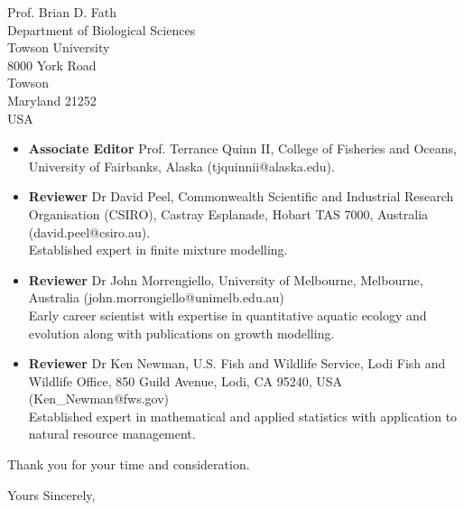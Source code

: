 \documentclass[12pt]{letter}
\begin{document}
\begin{letter}{Prof. Brian D. Fath \\ Department of Biological Sciences \\
		Towson University \\ 8000 York Road \\ Towson \\ Maryland 21252 \\ USA}
\begin{itemize} 
	\item {\bf Associate Editor} Prof. Terrance Quinn II, College of
		Fisheries and Oceans, University of Fairbanks, Alaska
		(tjquinnii@alaska.edu).\\ 
	\item {\bf Reviewer} Dr David Peel, Commonwealth Scientific and
		Industrial Research Organisation (CSIRO), Castray Esplanade,
		Hobart TAS 7000, Australia (david.peel@csiro.au). \\
		Established expert in finite mixture modelling.  
	\item {\bf Reviewer} Dr John Morrengiello, University of Melbourne,
		Melbourne, Australia (john.morrongiello@unimelb.edu.au) \\
		Early career scientist with expertise in quantitative aquatic
		ecology and evolution along with publications on growth
		modelling.  
	\item {\bf Reviewer} Dr Ken Newman, U.S. Fish and Wildlife Service,
		Lodi Fish and Wildlife Office, 850 Guild Avenue, Lodi, CA
		95240, USA (Ken\_Newman@fws.gov)\\ Established expert in
		mathematical and applied statistics with application to natural
		resource management.  
\end{itemize}

Thank you for your time and consideration.

\closing{Yours Sincerely,} \end{letter} 
\end{document}
